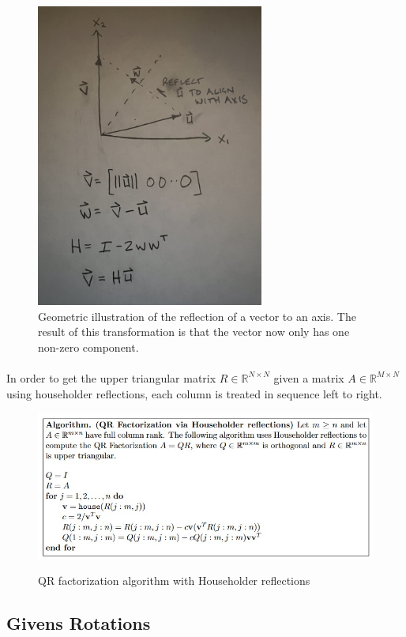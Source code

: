 \documentclass{article}
\begin{document}
\begin{figure}[h]
\centering
\includegraphics[width=75mm, angle=-90]{Householder2}
\caption{Geometric illustration of the reflection of a vector to an axis. The result of this transformation is that the vector now only has one non-zero component.}
\end{figure}

\paragraph{}
In order to get the upper triangular matrix $R \in\mathbb{R}^{N\times{}N}$ given a matrix $A \in\mathbb{R}^{M\times{}N}$ using householder reflections, each column is treated in sequence left to right. 
\pagebreak
\begin{figure}[h]
\centering
\includegraphics[width=140mm, angle=0]{Householder}
\caption{QR factorization algorithm with Householder reflections}\cite{lambers21}
\end{figure}

\subsection{Givens Rotations}
\end{document}
